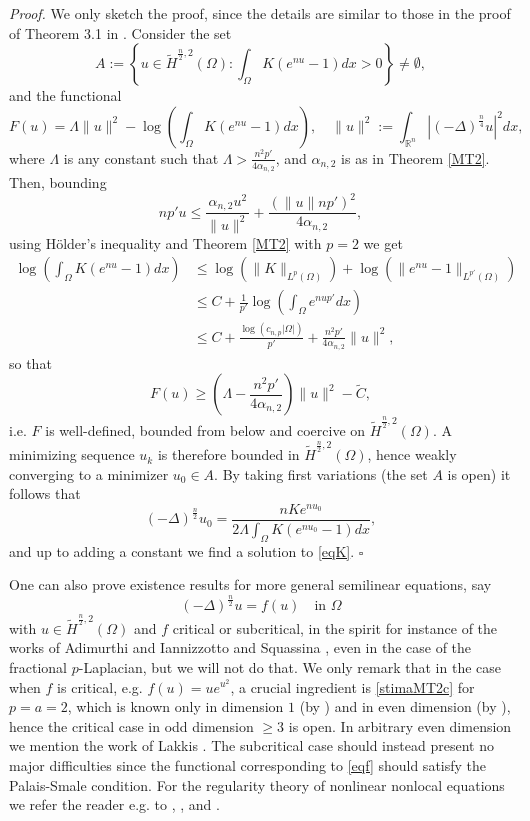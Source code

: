 \documentclass[11pt, a4paper]{article}
\newcommand{\R}{\mathbb{R}}
\newenvironment{proof}{\noindent\emph{Proof.}}{\phantom{ } \hfill$\square$\medskip}
\begin{document}
\begin{proof} We only sketch the proof, since the details are similar to those in the proof of Theorem 3.1 in \cite{MS}. Consider the set
$$A:=\left\{u\in \tilde H^{\frac n2,2}(\Omega):\int_\Omega K (e^{nu}-1)dx>0\right\}\ne \emptyset,$$
and the functional
$$F(u)= \Lambda \|u\|^2 -\log \left(\int_\Omega K(e^{nu}-1)dx \right),\quad \|u\|^2:=\int_{\R^n}|(-\Delta)^\frac{n}{4} u|^2 dx,$$
where $\Lambda$ is any constant such that 
$\Lambda>\frac{n^2 p'}{4\alpha_{n,2}}$, and $\alpha_{n,2}$ is as in Theorem \ref{MT2}. Then, bounding
$$np'u \le \frac{\alpha_{n,2}u^2}{\|u\|^2}+ \frac{(\|u\| np')^2}{4\alpha_{n,2}},$$
using H\"older's inequality and Theorem \ref{MT2} with $p=2$ we get
\[
\begin{split}
\log \left(\int_\Omega K(e^{nu}-1)dx \right)&\le \log(\|K\|_{L^p(\Omega)})+\log(\|e^{nu}-1\|_{L^{p'}(\Omega)})\\
&\le C+\frac{1}{p'}\log\left(\int_\Omega e^{nup'}dx\right)\\
& \le C  +\frac{\log(c_{n,p}|\Omega|)}{p'}+\frac{n^2p'}{4\alpha_{n,2}}\|u\|^2,
\end{split}
\]
so that
$$F(u)\ge \left(\Lambda-\frac{n^2 p'}{4\alpha_{n,2}}\right)\|u\|^2-\tilde C,$$
i.e. $F$ is well-defined, bounded from below and coercive on $\tilde H^{\frac n2,2}(\Omega)$. A minimizing sequence $u_k$ is therefore bounded in $\tilde H^{\frac{n}{2},2}(\Omega)$, hence weakly converging to a minimizer $u_0\in A$. By taking first variations (the set $A$ is open) it follows that
$$(-\Delta)^\frac{n}{2} u_0= \frac{nKe^{nu_0}}{2\Lambda\int_\Omega K(e^{nu_0}-1)dx},$$
and up to adding a constant we find a solution to \eqref{eqK}.
\end{proof}

One can also prove existence results for more general semilinear equations, say
\begin{equation}\label{eqf}
(-\Delta)^\frac{n}{2} u=f(u)\quad \text{in }\Omega
\end{equation}
with $u\in \tilde H^{\frac{n}{2},2}(\Omega)$ and $f$ critical or subcritical, in the spirit for instance of the works of Adimurthi \cite{adi} and Iannizzotto and Squassina \cite{IS}, even in the case of the fractional $p$-Laplacian, but we will not do that. We only remark that in the case when $f$ is critical, e.g. $f(u)= ue^{u^2}$, a crucial ingredient is \eqref{stimaMT2c} for $p=a=2$, which is known only in dimension $1$ (by \cite{IMM}) and in even dimension (by \cite{ada}), hence the critical case in odd dimension $\ge 3$ is open. In arbitrary even dimension we mention the work of Lakkis \cite{lak}. The subcritical case should instead present no major difficulties since the functional corresponding to \eqref{eqf} should satisfy the Palais-Smale condition. For the regularity theory of nonlinear nonlocal equations we refer the reader e.g. to \cite{KMS1}, \cite{KMS2}, \cite{RS} and \cite{Sil}.
\end{document}
